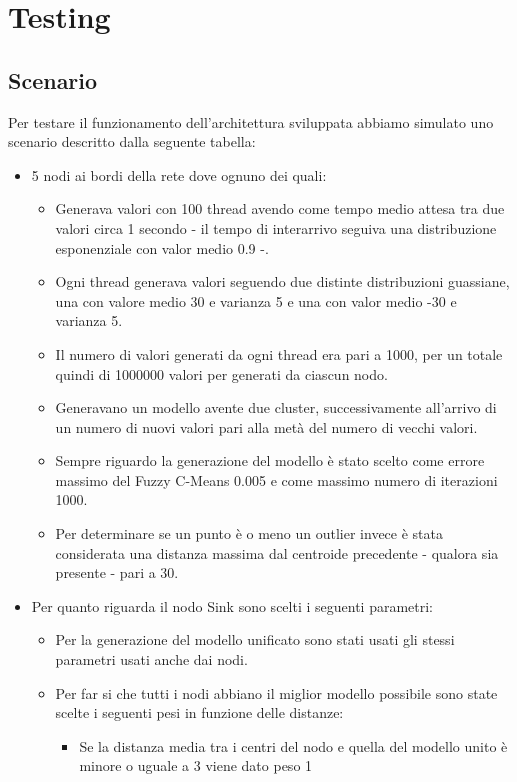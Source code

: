 \chapter{Testing}
\section{Scenario}
Per testare il funzionamento dell'architettura sviluppata abbiamo simulato uno scenario descritto dalla seguente tabella:
\begin{itemize}
  \item 5 nodi ai bordi della rete dove ognuno dei quali:
    \begin{itemize}
      \item Generava valori con 100 thread avendo come tempo medio attesa tra due valori circa 1 secondo - il tempo di interarrivo seguiva una distribuzione esponenziale con valor medio 0.9 -.
      \item Ogni thread generava valori seguendo due distinte distribuzioni guassiane, una con valore medio 30 e varianza 5 e una con valor medio -30 e varianza 5.
      \item Il numero di valori generati da ogni thread era pari a 1000, per un totale quindi di 1000000 valori per generati da ciascun nodo.
      \item Generavano un modello avente due cluster, successivamente all'arrivo di un numero di nuovi valori pari alla metà del numero di vecchi valori.
      \item Sempre riguardo la generazione del modello è stato scelto come errore massimo del Fuzzy C-Means 0.005 e come massimo numero di iterazioni 1000.
      \item Per determinare se un punto è o meno un outlier invece è stata considerata una distanza massima dal centroide precedente - qualora sia presente - pari a 30.
    \end{itemize}
  \item Per quanto riguarda il nodo Sink sono scelti i seguenti parametri:
    \begin{itemize}
      \item Per la generazione del modello unificato sono stati usati gli stessi parametri usati anche dai nodi.
      \item Per far si che tutti i nodi abbiano il miglior modello possibile sono state scelte i seguenti pesi in funzione delle distanze:
          \begin{itemize}
            \item Se la distanza media tra i centri del nodo e quella del modello unito è minore o uguale a 3 viene dato peso 1

\end{itemize}
\end{itemize}
\end{itemize}
